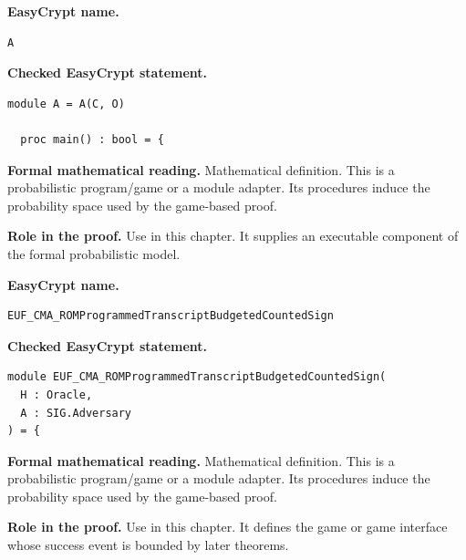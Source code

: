\begin{formaldefinition}
\noindent\textbf{EasyCrypt name.}
\begin{lstlisting}[language=EasyCrypt,basicstyle=\ttfamily\scriptsize]
A
\end{lstlisting}
\noindent\textbf{Checked EasyCrypt statement.}
\begin{lstlisting}[language=EasyCrypt,basicstyle=\ttfamily\scriptsize]
module A = A(C, O)

  proc main() : bool = {
\end{lstlisting}
\noindent\textbf{Formal mathematical reading.}
Mathematical definition. This is a probabilistic program/game or a module adapter.  Its procedures induce the probability space used by the game-based proof.

\noindent\textbf{Role in the proof.}
Use in this chapter. It supplies an executable component of the formal probabilistic model.

\end{formaldefinition}

\begin{formaldefinition}
\noindent\textbf{EasyCrypt name.}
\begin{lstlisting}[language=EasyCrypt,basicstyle=\ttfamily\scriptsize]
EUF_CMA_ROMProgrammedTranscriptBudgetedCountedSign
\end{lstlisting}
\noindent\textbf{Checked EasyCrypt statement.}
\begin{lstlisting}[language=EasyCrypt,basicstyle=\ttfamily\scriptsize]
module EUF_CMA_ROMProgrammedTranscriptBudgetedCountedSign(
  H : Oracle,
  A : SIG.Adversary
) = {
\end{lstlisting}
\noindent\textbf{Formal mathematical reading.}
Mathematical definition. This is a probabilistic program/game or a module adapter.  Its procedures induce the probability space used by the game-based proof.

\noindent\textbf{Role in the proof.}
Use in this chapter. It defines the game or game interface whose success event is bounded by later theorems.

\end{formaldefinition}

